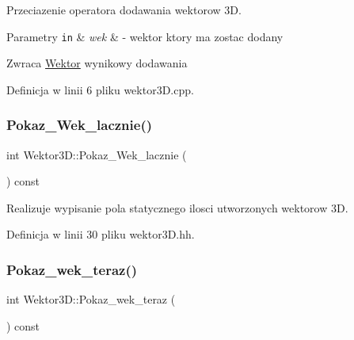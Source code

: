 Przeciazenie operatora dodawania wektorow 3D. 


\begin{DoxyParams}[1]{Parametry}
\mbox{\tt in}  & {\em wek} & -\/ wektor ktory ma zostac dodany \\
\hline
\end{DoxyParams}
\begin{DoxyReturn}{Zwraca}
\hyperlink{class_wektor}{Wektor} wynikowy dodawania 
\end{DoxyReturn}


Definicja w linii 6 pliku wektor3\+D.\+cpp.

\mbox{\label{class_wektor3_d_adaa56ab5d4c5a31d3e42909b2f3a07af}} 
\subsubsection{\texorpdfstring{Pokaz\+\_\+\+Wek\+\_\+lacznie()}{Pokaz\_Wek\_lacznie()}}
{\footnotesize\ttfamily int Wektor3\+D\+::\+Pokaz\+\_\+\+Wek\+\_\+lacznie (\begin{DoxyParamCaption}{ }\end{DoxyParamCaption}) const\hspace{0.3cm}{\ttfamily [inline]}}



Realizuje wypisanie pola statycznego ilosci utworzonych wektorow 3D. 



Definicja w linii 30 pliku wektor3\+D.\+hh.

\mbox{\label{class_wektor3_d_a1790e3cb0d7ab755639e901c3065831a}} 
\subsubsection{\texorpdfstring{Pokaz\+\_\+wek\+\_\+teraz()}{Pokaz\_wek\_teraz()}}
{\footnotesize\ttfamily int Wektor3\+D\+::\+Pokaz\+\_\+wek\+\_\+teraz (\begin{DoxyParamCaption}{ }\end{DoxyParamCaption}) const\hspace{0.3cm}{\ttfamily [inline]}}



